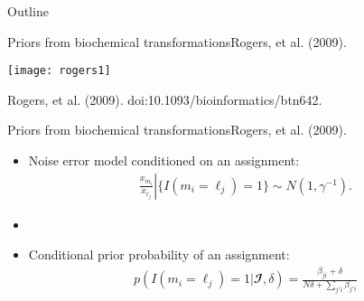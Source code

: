 \documentclass[xcolor=dvipsnames]{beamer}
\begin{document}
\begin{frame}{Outline}
	\vspace{-10.5pt}
	\tableofcontents[currentsection,subsectionstyle=show/shaded/hide]
\end{frame}

\begin{frame}{Priors from biochemical transformations}{Rogers, et al. (2009).}
	\vspace{-15pt}
	\begin{center}
		\texttt{[image: rogers1]}
		
		Rogers, et al. (2009). doi:10.1093/bioinformatics/btn642.
	\end{center}
\end{frame}

\begin{frame}{Priors from biochemical transformations}{Rogers, et al. (2009).}
	\vspace{-12pt}
	\begin{itemize}
		\item Noise error model conditioned on an assignment:
		\begin{align*}
		\left. \frac{x_{m_i}}{x_{\ell_j}} \right| \{ I(m_i=\ell_j )=1 \} \sim N\left(1, \gamma^{-1}\right).
		\end{align*} \pause
		\item[]
		\item Conditional prior probability of an assignment:
		\begin{align*}
		p( I(m_i=\ell_j )=1|\mathbfcal{I},\delta) =  \frac{\beta_{ji}+\delta}{N\delta+\sum_{j'i} \beta_{j'i}}
		\end{align*}
	\end{itemize}
\end{frame}
\end{document}
